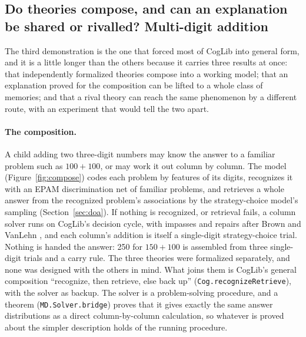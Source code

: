 \documentclass[11pt]{article}
\newcommand{\lean}[1]{\texttt{#1}}
\begin{document}
\subsection{Do theories compose, and can an explanation be shared or rivalled? Multi-digit addition}
\label{sec:compose}

The third demonstration is the one that forced most of CogLib into
general form, and it is a little longer than the others because it
carries three results at once: that independently formalized theories
compose into a working model; that an explanation proved for the
composition can be lifted to a whole class of memories; and that a
rival theory can reach the same phenomenon by a different route, with
an experiment that would tell the two apart.

\paragraph{The composition.} A child adding two three-digit numbers may
know the answer to a familiar problem such as $100+100$, or may work
it out column by column. The model (Figure~\ref{fig:compose}) codes
each problem by features of its digits, recognizes it with an EPAM
discrimination net \citep{feigenbaum1959,feigenbaum1962} of familiar
problems, and retrieves a whole answer from the recognized problem's
associations by the strategy-choice model's sampling
(Section~\ref{sec:doa}). If nothing is recognized, or retrieval
fails, a column solver runs on CogLib's decision cycle, with impasses
and repairs after Brown and VanLehn \citep{brown1980}, and each
column's addition is itself a single-digit strategy-choice trial.
Nothing is handed the answer: 250 for $150+100$ is assembled from three
single-digit trials and a carry rule. The three theories were
formalized separately, and none was designed with the others in mind.
What joins them is CogLib's general composition ``recognize, then
retrieve, else back up'' (\lean{Cog.recognizeRetrieve}), with the
solver as backup. The solver is a problem-solving procedure, and a
theorem (\lean{MD.Solver.bridge}) proves that it gives exactly the same
answer distributions as a direct column-by-column calculation, so
whatever is proved about the simpler description holds of the running
procedure.
\end{document}
